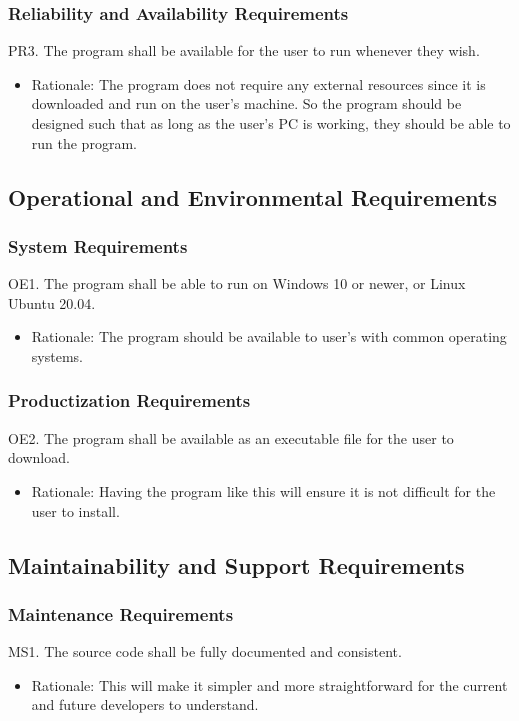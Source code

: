 \documentclass[12pt, titlepage]{article}
\begin{document}
\subsubsection{Reliability and Availability Requirements}
PR3. The program shall be available for the user to run whenever they wish.
\begin{itemize}
    \item Rationale: The program does not require any external resources since it is downloaded and run on the user's machine. So the program should be designed such that as long as the user's PC is working, they should be able to run the program.
\end{itemize}

\subsection{Operational and Environmental Requirements}
\subsubsection{System Requirements}
OE1. The program shall be able to run on Windows 10 or newer, or Linux Ubuntu 20.04.
\begin{itemize}
    \item Rationale: The program should be available to user's with common operating systems.
\end{itemize}
\subsubsection{Productization Requirements}
OE2. The program shall be available as an executable file for the user to download.
\begin{itemize}
    \item Rationale: Having the program like this will ensure it is not difficult for the user to install.
\end{itemize}

\subsection{Maintainability and Support Requirements}
\subsubsection{Maintenance Requirements}
MS1. The source code shall be fully documented and consistent.
\begin{itemize}
    \item Rationale: This will make it simpler and more straightforward for the current and future developers to understand.
\end{itemize}
\end{document}
